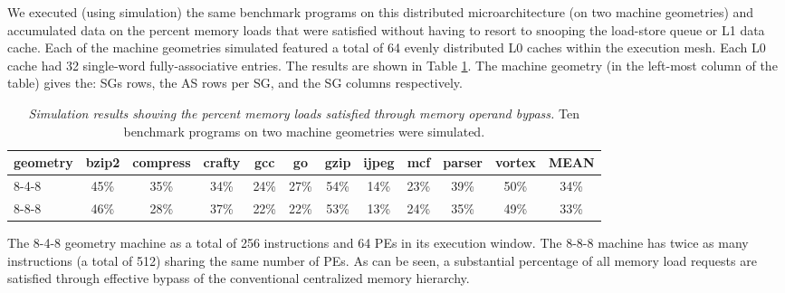 \documentclass[10pt,dvips]{article}
\begin{document}
We executed (using simulation) the same benchmark programs on this 
distributed microarchitecture (on two machine geometries)
and accumulated data on
the percent memory loads that were satisfied without having to
resort to snooping the load-store queue or L1 data cache.
Each of the machine geometries simulated featured a total of 64
evenly distributed L0 caches within the execution mesh.
Each L0 cache had 32 single-word fully-associative entries.
The results are shown in Table \ref{tab:results}.
The machine geometry (in the left-most column of the table)
gives the: SGs rows, the AS rows per SG, and the SG columns respectively.
%
\begin{table}
\begin{center}
\caption{{\em Simulation results showing the percent memory loads
satisfied through memory operand bypass.}
Ten benchmark programs on two machine geometries were simulated.}
\label{tab:results}
\vspace{+0.1in}
\begin{tabular}{|l|c|c|c|c|c|c|c|c|c|c|c|}
\hline 
geometry&
bzip2&compress&crafty&gcc&go&gzip&ijpeg&mcf&parser&vortex&MEAN\\
\hline
\hline
8-4-8&45\%&35\%&34\%&24\%&27\%&54\%&14\%&23\%&39\%&50\%&34\%\\
\hline
8-8-8&46\%&28\%&37\%&22\%&22\%&53\%&13\%&24\%&35\%&49\%&33\%\\
\hline
\end{tabular}
\end{center}
\end{table}
%
The 8-4-8 geometry machine as a total of 256 instructions and 64 PEs in its
execution window.
The 8-8-8 machine has twice as many instructions (a total of 512)
sharing the same number of PEs.
As can be seen, a substantial percentage of all memory load
requests are satisfied through effective bypass of the conventional
centralized memory hierarchy.
%
%
\end{document}
